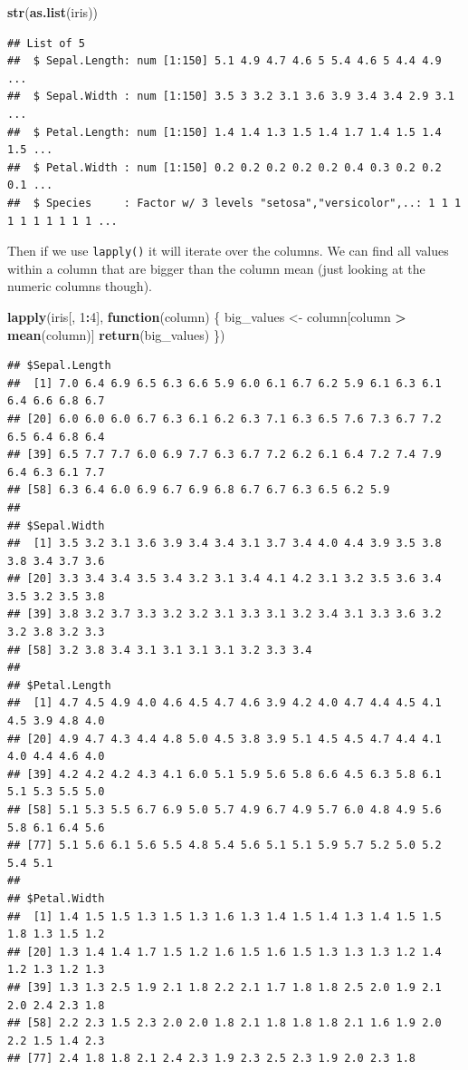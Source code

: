 \documentclass[
]{book}
\newenvironment{Shaded}{\begin{snugshade}}{\end{snugshade}}
\newcommand{\ControlFlowTok}[1]{\textcolor[rgb]{0.13,0.29,0.53}{\textbf{#1}}}
\newcommand{\DecValTok}[1]{\textcolor[rgb]{0.00,0.00,0.81}{#1}}
\newcommand{\KeywordTok}[1]{\textcolor[rgb]{0.13,0.29,0.53}{\textbf{#1}}}
\newcommand{\NormalTok}[1]{#1}
\newcommand{\OperatorTok}[1]{\textcolor[rgb]{0.81,0.36,0.00}{\textbf{#1}}}
\newcommand{\StringTok}[1]{\textcolor[rgb]{0.31,0.60,0.02}{#1}}
\begin{document}
\begin{Shaded}
\begin{Highlighting}[]
\KeywordTok{str}\NormalTok{(}\KeywordTok{as.list}\NormalTok{(iris))}
\end{Highlighting}
\end{Shaded}

\begin{verbatim}
## List of 5
##  $ Sepal.Length: num [1:150] 5.1 4.9 4.7 4.6 5 5.4 4.6 5 4.4 4.9 ...
##  $ Sepal.Width : num [1:150] 3.5 3 3.2 3.1 3.6 3.9 3.4 3.4 2.9 3.1 ...
##  $ Petal.Length: num [1:150] 1.4 1.4 1.3 1.5 1.4 1.7 1.4 1.5 1.4 1.5 ...
##  $ Petal.Width : num [1:150] 0.2 0.2 0.2 0.2 0.2 0.4 0.3 0.2 0.2 0.1 ...
##  $ Species     : Factor w/ 3 levels "setosa","versicolor",..: 1 1 1 1 1 1 1 1 1 1 ...
\end{verbatim}

Then if we use \texttt{lapply()} it will iterate over the columns. We can find all values within a column that are bigger than the column mean (just looking at the numeric columns though).

\begin{Shaded}
\begin{Highlighting}[]
\KeywordTok{lapply}\NormalTok{(iris[, }\DecValTok{1}\OperatorTok{:}\DecValTok{4}\NormalTok{], }\ControlFlowTok{function}\NormalTok{(column) \{}
\NormalTok{    big_values <-}\StringTok{ }\NormalTok{column[column }\OperatorTok{>}
\StringTok{        }\KeywordTok{mean}\NormalTok{(column)]}
    \KeywordTok{return}\NormalTok{(big_values)}
\NormalTok{\})}
\end{Highlighting}
\end{Shaded}

\begin{verbatim}
## $Sepal.Length
##  [1] 7.0 6.4 6.9 6.5 6.3 6.6 5.9 6.0 6.1 6.7 6.2 5.9 6.1 6.3 6.1 6.4 6.6 6.8 6.7
## [20] 6.0 6.0 6.0 6.7 6.3 6.1 6.2 6.3 7.1 6.3 6.5 7.6 7.3 6.7 7.2 6.5 6.4 6.8 6.4
## [39] 6.5 7.7 7.7 6.0 6.9 7.7 6.3 6.7 7.2 6.2 6.1 6.4 7.2 7.4 7.9 6.4 6.3 6.1 7.7
## [58] 6.3 6.4 6.0 6.9 6.7 6.9 6.8 6.7 6.7 6.3 6.5 6.2 5.9
## 
## $Sepal.Width
##  [1] 3.5 3.2 3.1 3.6 3.9 3.4 3.4 3.1 3.7 3.4 4.0 4.4 3.9 3.5 3.8 3.8 3.4 3.7 3.6
## [20] 3.3 3.4 3.4 3.5 3.4 3.2 3.1 3.4 4.1 4.2 3.1 3.2 3.5 3.6 3.4 3.5 3.2 3.5 3.8
## [39] 3.8 3.2 3.7 3.3 3.2 3.2 3.1 3.3 3.1 3.2 3.4 3.1 3.3 3.6 3.2 3.2 3.8 3.2 3.3
## [58] 3.2 3.8 3.4 3.1 3.1 3.1 3.1 3.2 3.3 3.4
## 
## $Petal.Length
##  [1] 4.7 4.5 4.9 4.0 4.6 4.5 4.7 4.6 3.9 4.2 4.0 4.7 4.4 4.5 4.1 4.5 3.9 4.8 4.0
## [20] 4.9 4.7 4.3 4.4 4.8 5.0 4.5 3.8 3.9 5.1 4.5 4.5 4.7 4.4 4.1 4.0 4.4 4.6 4.0
## [39] 4.2 4.2 4.2 4.3 4.1 6.0 5.1 5.9 5.6 5.8 6.6 4.5 6.3 5.8 6.1 5.1 5.3 5.5 5.0
## [58] 5.1 5.3 5.5 6.7 6.9 5.0 5.7 4.9 6.7 4.9 5.7 6.0 4.8 4.9 5.6 5.8 6.1 6.4 5.6
## [77] 5.1 5.6 6.1 5.6 5.5 4.8 5.4 5.6 5.1 5.1 5.9 5.7 5.2 5.0 5.2 5.4 5.1
## 
## $Petal.Width
##  [1] 1.4 1.5 1.5 1.3 1.5 1.3 1.6 1.3 1.4 1.5 1.4 1.3 1.4 1.5 1.5 1.8 1.3 1.5 1.2
## [20] 1.3 1.4 1.4 1.7 1.5 1.2 1.6 1.5 1.6 1.5 1.3 1.3 1.3 1.2 1.4 1.2 1.3 1.2 1.3
## [39] 1.3 1.3 2.5 1.9 2.1 1.8 2.2 2.1 1.7 1.8 1.8 2.5 2.0 1.9 2.1 2.0 2.4 2.3 1.8
## [58] 2.2 2.3 1.5 2.3 2.0 2.0 1.8 2.1 1.8 1.8 1.8 2.1 1.6 1.9 2.0 2.2 1.5 1.4 2.3
## [77] 2.4 1.8 1.8 2.1 2.4 2.3 1.9 2.3 2.5 2.3 1.9 2.0 2.3 1.8
\end{verbatim}
\end{document}
